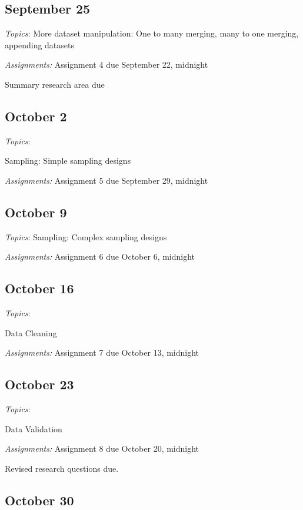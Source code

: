 \documentclass[12pt]{article}
\begin{document}
\begin{flushleft}
\subsection{September 25}

\textit{Topics}:
More dataset manipulation: One to many merging, many to one merging, appending datasets

\textit {Assignments:}
Assignment 4 due September 22, midnight

Summary research area due

\subsection{October 2}

\textit{Topics}:

Sampling: Simple sampling designs

\textit {Assignments:}
Assignment 5 due September 29, midnight

\subsection{October 9}


\textit{Topics}:
Sampling: Complex sampling designs


\textit {Assignments:}
Assignment 6 due October 6, midnight

\subsection{October 16}

\textit{Topics}:

Data Cleaning

\textit {Assignments:}
Assignment 7 due October 13, midnight

\subsection{October 23}

\textit{Topics}:

Data Validation

\textit {Assignments:}
Assignment 8 due October 20, midnight

Revised research questions due. 

\subsection{October 30}


\end{flushleft}
\end{document}
